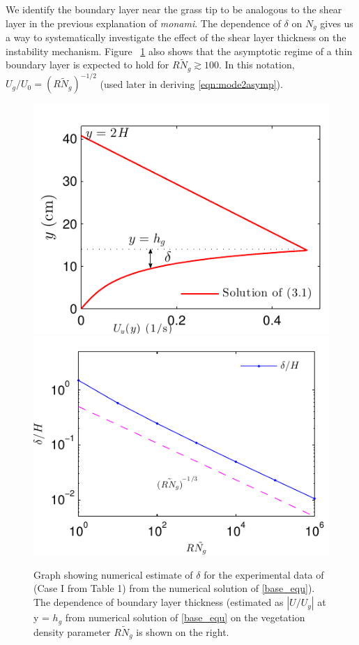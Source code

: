 \documentclass[12pt]{report}   %
\newcommand{\Rey}{{R}}
\newcommand{\Ndg}{\tilde{N}_g}
\newcommand{\monami}{\textit{monami}}
\newcommand{\ReyNdg}{{\Rey\Ndg}}
\begin{document}
We identify the boundary layer near the grass tip to be analogous to the shear layer \cite{Ghisal02,Nepf04} in the previous explanation of \monami.
The dependence of $\delta$ on $N_g$ gives us a way to systematically investigate the effect of the shear layer thickness on the instability mechanism.
Figure ~\ref{Uy_base} also shows that the asymptotic regime of a thin boundary layer is expected to hold for $\ReyNdg \gtrsim 100$. 
In this notation, $U_g/U_0 = (\Rey \Ndg)^{-1/2}$ (used later in deriving \eqref{eqn:mode2asymp}). 
\begin{figure}
\centerline{\includegraphics[scale=1.]{Grass_Base_Nepf_shear_scale} \includegraphics[scale=1.]{Grass_shear_scale}}
\caption{Graph showing numerical estimate of $\delta$ for the experimental data of \cite{Nepf04} (Case I from Table 1) from the numerical solution of \eqref{base_equ}). The dependence of boundary layer thickness (estimated as $|U/U_y|$ at y = $h_g$ from numerical solution of \ref{base_equ} on the vegetation density parameter $R\Ndg$ is shown on the right.
}
\label{Uy_base}
\end{figure}
\end{document}
